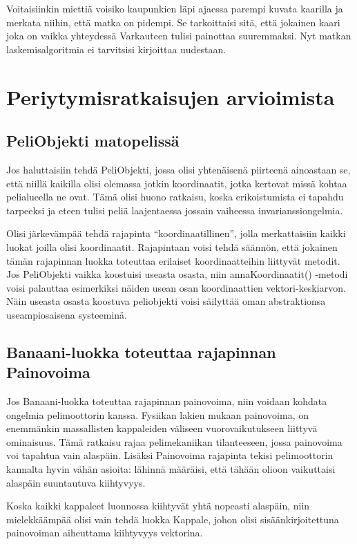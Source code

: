 Voitaisiinkin miettiä voisiko kaupunkien läpi ajaessa parempi kuvata kaarilla ja
merkata niihin, että matka on pidempi. Se tarkoittaisi sitä, että jokainen kaari
joka on vaikka yhteydessä Varkauteen tulisi painottaa suuremmaksi. Nyt matkan
laskemisalgoritmia ei tarvitsisi kirjoittaa uudestaan.

\section{Periytymisratkaisujen arvioimista}

\label{}

\subsection{PeliObjekti matopelissä}

Jos haluttaisiin tehdä PeliObjekti, jossa olisi yhtenäisenä piirteenä ainoastaan
se, että niillä kaikilla olisi olemassa jotkin koordinaatit, jotka kertovat
missä kohtaa pelialueella ne ovat. Tämä olisi huono ratkaisu, koska
erikoistumista ei tapahdu tarpeeksi ja eteen tulisi peliä laajentaessa jossain
vaiheessa invarianssiongelmia.

Olisi järkevämpää tehdä rajapinta ``koordinaatillinen'', jolla merkattaisiin kaikki
luokat joilla olisi koordinaatit. Rajapintaan voisi tehdä säännön, että jokainen
tämän rajapinnan luokka toteuttaa erilaiset koordinaatteihin liittyvät metodit.
Jos PeliObjekti vaikka koostuisi useasta osasta, niin annaKoordinaatit() -metodi
voisi palauttaa esimerkiksi näiden usean osan koordinaattien vektori-keskiarvon.
Näin useasta osasta koostuva peliobjekti voisi säilyttää oman abstraktionsa
useampiosaisena systeeminä.

\subsection{Banaani-luokka toteuttaa rajapinnan Painovoima}

Jos Banaani-luokka toteuttaa rajapinnan painovoima, niin voidaan kohdata
ongelmia pelimoottorin kanssa. Fysiikan lakien mukaan painovoima, on enemmänkin
massallisten kappaleiden väliseen vuorovaikutukseen liittyvä ominaisuus. Tämä
ratkaisu rajaa pelimekaniikan tilanteeseen, jossa painovoima voi tapahtua vain
alaspäin. Lisäksi Painovoima rajapinta tekisi pelimoottorin kannalta hyvin vähän
asioita: lähinnä määräisi, että tähään olioon vaikuttaisi alaspäin suuntautuva
kiihtyvyys.

Koska kaikki kappaleet luonnossa kiihtyvät yhtä nopeasti alaspäin, niin
mielekkäämpää olisi vain tehdä luokka Kappale, johon olisi sisäänkirjoitettuna
painovoiman aiheuttama kiihtyvyys vektorina.


